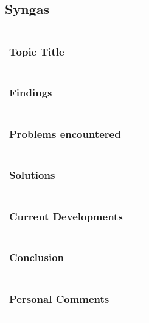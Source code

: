 \documentclass[12pt,a4paper,numbers=noenddot]{scrartcl}
\begin{document}
\newpage
\subsection{Syngas}
\begin{xtabular}{|p{3.8cm}|p{8.3cm}|p{4.2cm}|}
	\vspace*{-1.25\baselineskip}\subsubsection{Topic Title}
	& 
	
	& 
	\\
	\vspace*{-1.25\baselineskip}\subsubsection{Findings}
	& 
	
	&
	\\
	\vspace*{-1.25\baselineskip}\subsubsection{Problems encountered}
	& 
	
	&
	\\
	\vspace*{-1.25\baselineskip}\subsubsection{Solutions}
	& 
	
	&
	\\
	\vspace*{-1.25\baselineskip}\subsubsection{Current Developments}
	& 
	
	&
	\\
	\vspace*{-1.25\baselineskip}\subsubsection{Conclusion}
	& 
	
	&
	\\
	\vspace*{-1.25\baselineskip}\subsubsection{Personal Comments}
	& 
	
	&
	\\
	\hline
\end{xtabular}
\end{document}
